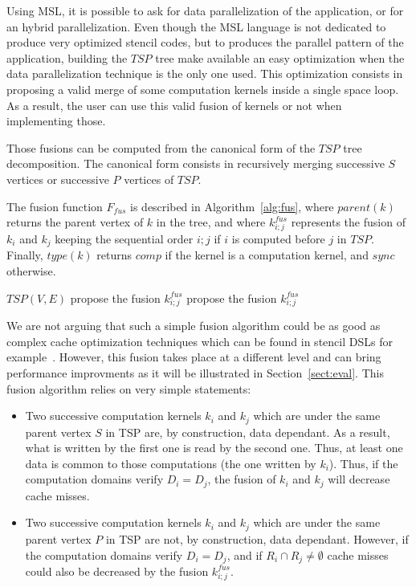 Using MSL, it is possible to ask for data parallelization of the application, or for an hybrid parallelization. Even though the MSL language is not dedicated to produce very optimized stencil codes, but to produces the parallel pattern of the application, building the $TSP$ tree make available an easy optimization when the data parallelization technique is the only one used. This optimization consists in proposing a valid merge of some computation kernels inside a single space loop. As a result, the user can use this valid fusion of kernels or not when implementing those. 

Those fusions can be computed from the canonical form of the $TSP$ tree decomposition. The canonical form consists in recursively merging successive $S$ vertices or successive $P$ vertices of $TSP$.

The fusion function $F_{fus}$ is described in Algorithm~\ref{alg:fus}, where $parent(k)$ returns the parent vertex of $k$ in the tree, and where $k_{i;j}^{fus}$ represents the fusion of $k_i$ and $k_j$ keeping the sequential order $i;j$ if $i$ is computed before $j$ in $TSP$. Finally, $type(k)$ returns $comp$ if the kernel is a computation kernel, and $sync$ otherwise.

\begin{algorithm}
\caption{$F_{fus}$}
\label{alg:fus}
\begin{algorithmic}[1]
 {$TSP(V,E)$}
\State propose the fusion $k_{i;j}^{fus}$
\EndIf
{}
\State propose the fusion $k_{i;j}^{fus}$
\EndIf
\EndIf
\EndIf
\EndIf
\EndFor
\EndProcedure
\end{algorithmic}
\end{algorithm}

We are not arguing that such a simple fusion algorithm could be as good as complex cache optimization techniques which can be found in stencil DSLs for example~\cite{spaaTangCKLL11}. However, this fusion takes place at a different level and can bring performance improvments as it will be illustrated in Section~\ref{sect:eval}. This fusion algorithm relies on very simple statements:
\begin{itemize}
\item Two successive computation kernels $k_i$ and $k_j$ which are under the same parent vertex $S$ in TSP are, by construction, data dependant. As a result, what is written by the first one is read by the second one. Thus, at least one data is common to those computations (the one written by $k_i$). Thus, if the computation domains verify $D_i=D_j$, the fusion of $k_i$ and $k_j$ will decrease cache misses.
\item Two successive computation kernels $k_i$ and $k_j$ which are under the same parent vertex $P$ in TSP are not, by construction, data dependant. However, if the computation domains verify $D_i=D_j$, and if $R_i \cap R_j \neq \emptyset$ cache misses could also be decreased by the fusion $k_{i;j}^{fus}$.
\end{itemize}






